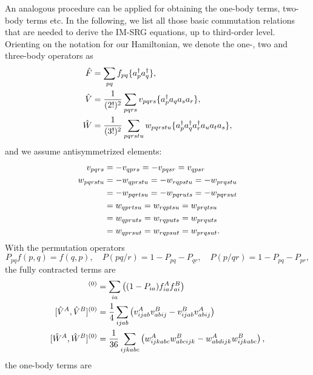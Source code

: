 An analogous procedure can be applied for obtaining the one-body terms, two-body terms etc. In the following, we list all those basic commutation relations that are needed to derive the IM-SRG equations, up to third-order level.\\
 Orienting on the notation for our Hamiltonian, we denote the one-, two and three-body operators as
\begin{align}
\begin{split}
\hat{F} &= \sum_{pq} f_{pq} \lbrace a^{\dagger}_p a^{\dagger}_q \rbrace, \\
\hat{V} &= \frac{1}{(2!)^2} \sum_{pqrs} v_{pqrs} \lbrace a^{\dagger}_p a_q a_s a_r \rbrace, \\
\hat{W} &= \frac{1}{(3!)^2}\sum_{pqrstu} w_{pqrstu} \lbrace a^{\dagger}_p a^{\dagger}_q a^{\dagger}_r a_u a_t a_s \rbrace,
\end{split}
\end{align}
and we assume antisymmetrized elements:
\begin{align}
v_{pqrs} &=- v_{qprs} = -v_{pqsr} = v_{qpsr} \\
w_{pqrstu} &= -w_{qprstu} = -w_{rqpstu} = -w_{prqstu} \notag \\
&= -w_{pqrtsu} =- w_{pqruts} =- w_{pqrsut} \notag \\
&= w_{qprtsu} = w_{rqptsu} = w_{prqtsu} \notag \\
&= w_{qpruts} = w_{rqputs} = w_{prquts} \notag \\
&= w_{qprsut} = w_{rqpsut} = w_{prqsut}. 
\end{align}
With the permutation operators
\[
P_{pq}f(p,q) = f(q,p), \quad P(pq/r) = 1-P_{pq}-P_{qr}, \quad P(p/qr) = 1-P_{pq}-P_{pr},
\]
the fully contracted terms are
\begin{align}
[\hat{F}^A,\hat{F}^B]^{(0)} &= \sum_{ia}\lb (1-P_{ia}) f_{ia}^A f_{ai}^B  \rb \\
[\hat{V}^A,\hat{V}^B]^{(0)} &= \frac{1}{4} \sum_{ijab} \lb v^A_{ijab}v^B_{abij} - v^B_{ijab} v^A_{abij} \rb \\
[\hat{W}^A,\hat{W}^B]^{(0)} &= \frac{1}{36} \sum_{ijkabc} \lb w^A_{ijkabc} w^B_{abcijk} - w^A_{abdijk} w^B_{ijkabc} \rb ,
\end{align}
the one-body terms are
